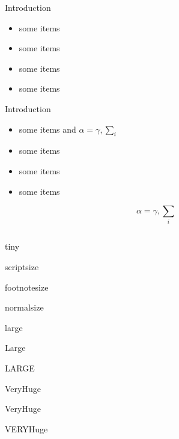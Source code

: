 \documentclass[final,hyperref={pdfpagelabels=false}]{beamer}
\begin{document}
\begin{frame}{}
\begin{columns}[T]
\begin{column}{.43\paperwidth}
\begin{block}{Introduction}
	\begin{itemize}
		\item some items
		\item some items
		\item some items
		\item some items
	\end{itemize}
\end{block}

\begin{block}{Introduction}
	\begin{itemize}
		\item some items and $\alpha=\gamma, \sum_{i}$
		\item some items
		\item some items
		\item some items
	\end{itemize}
	
	$$\alpha=\gamma, \sum_{i}$$

\end{block}
    
\end{column}

\end{columns}
\vfill    
\begin{block}{}
	\centering
	{\tiny tiny}\par
	{\scriptsize scriptsize}\par
	{\footnotesize footnotesize}\par
	{\normalsize normalsize}\par
	{\large large}\par
	{\Large Large}\par
	{\LARGE LARGE}\par
	{\veryHuge VeryHuge}\par
	{\VeryHuge VeryHuge}\par
	{\VERYHuge VERYHuge}\par
\end{block}
\vfill
\end{frame}
\end{document}
